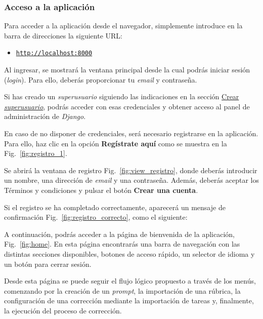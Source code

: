 \subsubsection{Acceso a la aplicación}

Para acceder a la aplicación desde el navegador, simplemente introduce en la barra de direcciones la siguiente URL:

\begin{itemize}
    \item \href{http://localhost:8000}{\texttt{http://localhost:8000}}
\end{itemize}

Al ingresar, se mostrará la ventana principal desde la cual podrás iniciar sesión (\textit{login}). Para ello, deberás proporcionar tu \textit{email} y contraseña.

Si has creado un \textit{superusuario} siguiendo las indicaciones en la sección \hyperref[sec:superuser]{Crear \textit{superusuario}}, podrás acceder con esas credenciales y obtener acceso al panel de administración de \textit{Django}.

En caso de no disponer de credenciales, será necesario registrarse en la aplicación. Para ello, haz clic en la opción \textbf{Regístrate aquí} como se muestra en la Fig.~\ref{fig:registro_1}.


Se abrirá la ventana de registro Fig.~\ref{fig:view_registro}, donde deberás introducir un nombre, una dirección de \textit{email} y una contraseña. Además, deberás aceptar los Términos y condiciones y pulsar el botón \textbf{Crear una cuenta}.


Si el registro se ha completado correctamente, aparecerá un mensaje de confirmación Fig.~\ref{fig:registro_correcto}, como el siguiente:


A continuación, podrás acceder a la página de bienvenida de la aplicación, Fig.~\ref{fig:home}. En esta página encontrarás una barra de navegación con las distintas secciones disponibles, botones de acceso rápido, un selector de idioma y un botón para cerrar sesión.


Desde esta página se puede seguir el flujo lógico propuesto a través de los menús, comenzando por la creación de un \textit{prompt}, la importación de una rúbrica, la configuración de una corrección mediante la importación de tareas y, finalmente, la ejecución del proceso de corrección.

